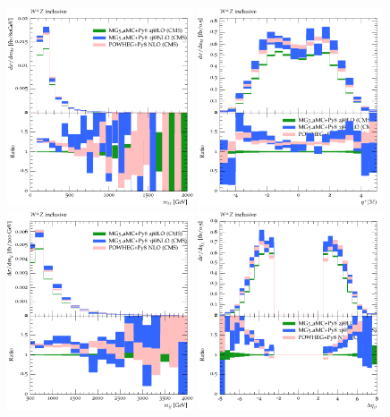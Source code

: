 \begin{figure}[htbp]
  \centering
   \includegraphics[width=0.49\textwidth]{figures/Simulation/QCDWZ_Mass3l.pdf}
   \includegraphics[width=0.49\textwidth]{figures/Simulation/QCDWZ_zep3l.pdf}
   \includegraphics[width=0.49\textwidth]{figures/Simulation/QCDWZ_mjj.pdf}
   \includegraphics[width=0.49\textwidth]{figures/Simulation/QCDWZ_dEtajj.pdf}

\end{figure}
